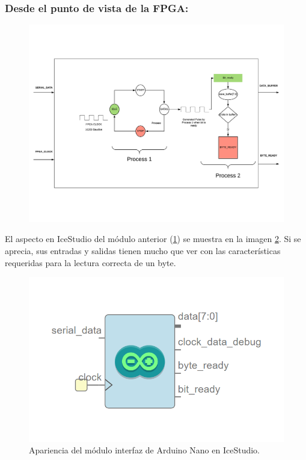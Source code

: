 \subsubsection{Desde el punto de vista de la FPGA:}
\begin{center}
	\begin{figure}[H]
		\center
		\includegraphics[trim = 0mm 0mm 0mm 10mm, clip,scale=0.9, angle=90]{imagenes/Balancing_robot/arduino_interfacefluid.pdf}
		\label{fig:arduino_interfacefluid}
	\end{figure}
\end{center}

El aspecto en IceStudio del módulo anterior (\ref{fig:arduino_interfacefluid}) se muestra en la imagen \ref{fig:arduino_interface}. Si se aprecia, sus entradas y salidas tienen mucho que ver con las características requeridas para la lectura correcta de un byte.

\begin{figure}[H]
	\center
	\includegraphics[scale=0.6]{imagenes/Balancing_robot/arduino_interface.PNG}
	\caption{Apariencia del módulo interfaz de Arduino Nano en IceStudio.}
	\label{fig:arduino_interface}
\end{figure}

